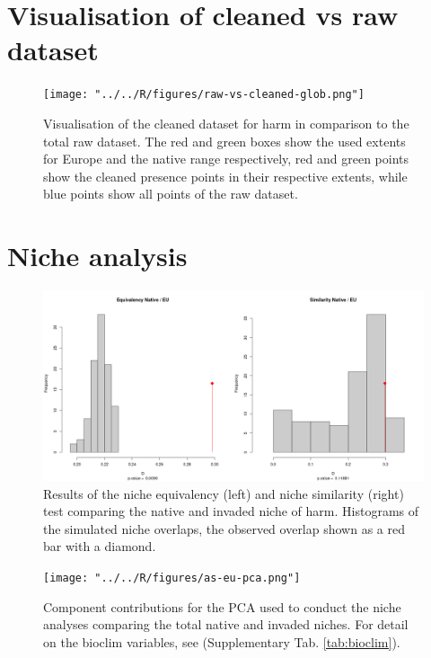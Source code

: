 \newpage
\appendix

\section{Visualisation of cleaned vs raw dataset}

\begin{figure}[!h]
    \centering
    \texttt{[image: "../../R/figures/raw-vs-cleaned-glob.png"]}
    \caption{\label{fig:raw_vs_cleaned_glob} Visualisation of the cleaned dataset for \gls{harm} in comparison to the total raw dataset. The red and green boxes show the used extents for Europe and the native range respectively, red and green points show the cleaned presence points in their respective extents, while blue points show all points of the raw dataset.}
\end{figure}



\section{Niche analysis}

\begin{figure}[!h]
    \centering
    \includegraphics[width = 0.9\linewidth]{"../../R/figures/as-eu-tot-eq-sim.png"}
    \caption{\label{fig:as_eu_eq_sim} Results of the niche equivalency (left) and niche similarity (right) test comparing the native and invaded niche of \gls{harm}. Histograms of the simulated niche overlaps, the observed overlap shown as a red bar with a diamond.}
\end{figure}

\begin{figure}[!h]
    \centering
    \texttt{[image: "../../R/figures/as-eu-pca.png"]}
    \caption{\label{fig:as_eu_niche_pca} Component contributions for the PCA used to conduct the niche analyses comparing the total native and invaded niches. For detail on the bioclim variables, see (Supplementary Tab. \ref{tab:bioclim}).}
\end{figure}

